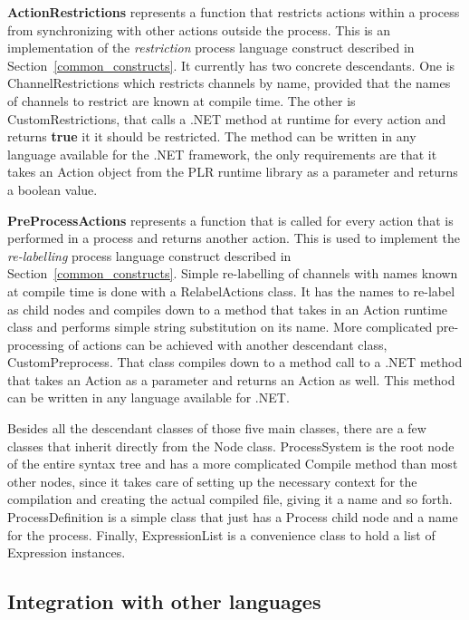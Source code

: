  	\textbf{ActionRestrictions} represents a function that restricts actions 
 	within a process from synchronizing with other actions outside the process. 
 	This is an implementation of the \textit{restriction} process language 
 	construct described in Section~\ref{common_constructs}. It currently has two 
 	concrete descendants. One is \textsf{ChannelRestrictions} which restricts 
 	channels by name, provided that the names of channels to restrict are known 
 	at compile time. The other is \textsf{CustomRestrictions}, that calls a .NET 
 	method at runtime for every action and returns \textbf{true} it it should be 
 	restricted. The method can be written in any language available for the .NET 
 	framework, the only requirements are that it takes an \textsf{Action} object 
 	from the PLR runtime library as a parameter and returns a boolean value.
	 
 	\textbf{PreProcessActions} represents a function that is called for every 
 	action that is performed in a process and returns another action. This is 
 	used to implement the \textit{re-labelling} process language construct 
 	described in Section~\ref{common_constructs}. Simple re-labelling of 
 	channels with names known at compile time is done with a 
 	\textsf{RelabelActions} class. It has the names to re-label as child nodes 
 	and compiles down to a method that takes in an \textsf{Action} runtime class 
 	and performs simple string substitution on its name. More complicated 
 	pre-processing of actions can be achieved with another descendant class, 
 	\textsf{CustomPreprocess}. That class compiles down to a method call to a 
 	.NET method that takes an \textsf{Action} as a parameter and returns an 
 	\textsf{Action} as well. This method can be written in any language 
 	available for .NET.
 	
 	Besides all the descendant classes of those five main classes, there are a 
 	few classes that inherit directly from the \textsf{Node} class. 
 	\textsf{ProcessSystem} is the root node of the entire syntax tree and has a 
 	more complicated \textsf{Compile} method than most other nodes, since it 
 	takes care of setting up the necessary context for the compilation and 
 	creating the actual compiled file, giving it a name and so forth. 
 	\textsf{ProcessDefinition} is a simple class that just has a 
 	\textsf{Process} child node and a name for the process. Finally, 
 	\textsf{ExpressionList} is a convenience class to hold a list of 
 	\textsf{Expression} instances.
 	
\subsection{Integration with other languages}


